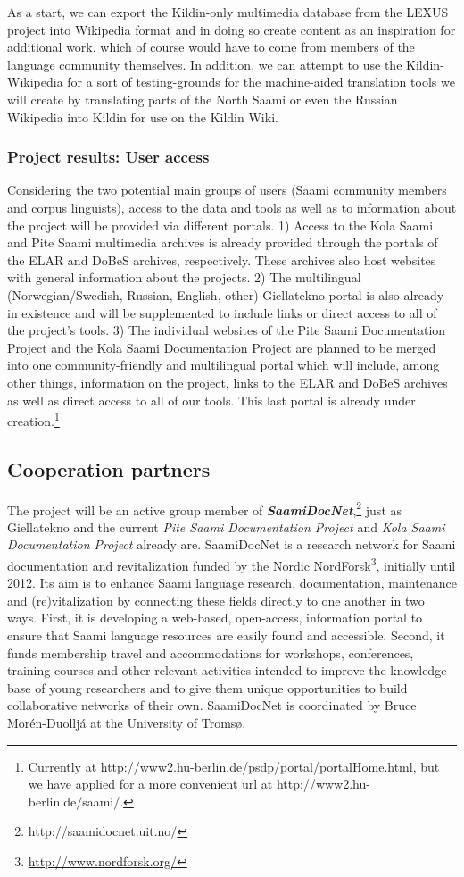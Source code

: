 \documentclass[a4paper,12pt]{article}
\begin{document}
As a start, we can export the Kildin-only multimedia database from the LEXUS project into Wikipedia format and in doing so create content as an inspiration for additional work, which of course would have to come from members of the language community themselves. In addition, we can attempt to use the Kildin-Wikipedia for a sort of testing-grounds for the machine-aided translation tools we will create by translating parts of the North Saami or even the Russian Wikipedia into Kildin for use on the Kildin Wiki.

\subsubsection{Project results: User access}\label{projectResult3}
Considering the two potential main groups of users (Saami community members and corpus linguists), access to the data and tools as well as to information about the project will be provided via different portals. 1) Access to the Kola Saami and Pite Saami multimedia archives is already provided through the portals of the ELAR and DoBeS archives, respectively. These archives also host websites with general information about the projects. 2) The multilingual (Norwegian/Swedish, Russian, English, other) Giellatekno portal is also already in existence and will be supplemented to include links or direct access to all of the project's tools. 3) The individual websites of the Pite Saami Documentation Project and the Kola Saami Documentation Project are planned to be merged into one community-friendly and multilingual portal which will include, among other things, information on the project, links to the ELAR and DoBeS archives as well as direct access to all of our tools. This last portal is already under creation.\footnote{Currently at http://www2.hu-berlin.de/psdp/portal/portalHome.html, but we have applied for a more convenient url at http://www2.hu-berlin.de/saami/.}

\subsection{Cooperation partners}\label{coop}
The project will be an active group member of \textit{\textbf{SaamiDocNet}},\footnote{http://saamidocnet.uit.no/} just as Giellatekno and the current {\it Pite Saami Documentation Project} and {\it Kola Saami Documentation Project} already are. SaamiDocNet is a research network for Saami documentation and revitalization funded by the Nordic NordForsk\footnote{\url{http://www.nordforsk.org/}}, initially until 2012. Its aim is to enhance Saami language research, documentation, maintenance and (re)vitalization by connecting these fields directly to one another in two ways. First, it is developing a web-based, open-access, information portal to ensure that Saami language resources are easily found and accessible. Second, it funds membership travel and accommodations for workshops, conferences, training courses and other relevant activities intended to improve the knowledge-base of young researchers and to give them unique opportunities to build collaborative networks of their own. SaamiDocNet is coordinated by Bruce Morén-Duolljá at the University of Tromsø.
\end{document}
